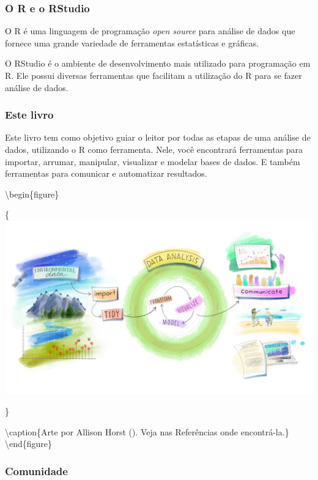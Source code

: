 \documentclass[
]{book}
\begin{document}
\hypertarget{o-r-e-o-rstudio}{%
\subsubsection*{O R e o RStudio}\label{o-r-e-o-rstudio}}

O R é uma linguagem de programação \emph{open source} para análise de dados que fornece uma grande variedade de ferramentas estatísticas e gráficas.

O RStudio é o ambiente de desenvolvimento mais utilizado para programação em R. Ele possui diversas ferramentas que facilitam a utilização do R para se fazer análise de dados.

\hypertarget{este-livro}{%
\subsubsection*{Este livro}\label{este-livro}}

Este livro tem como objetivo guiar o leitor por todas as etapas de uma análise de dados, utilizando o R como ferramenta. Nele, você encontrará ferramentas para importar, arrumar, manipular, visualizar e modelar bases de dados. E também ferramentas para comunicar e automatizar resultados.

\textbackslash begin\{figure\}

\{\centering \includegraphics[width=26.67in]{assets/img/environmental-data-science-r4ds-general}

\}

\textbackslash caption\{Arte por Allison Horst (\citet{allison_horst}). Veja nas Referências onde encontrá-la.\}\label{fig:allison-env}
\textbackslash end\{figure\}

\hypertarget{comunidade}{%
\subsubsection*{Comunidade}\label{comunidade}}
\end{document}
